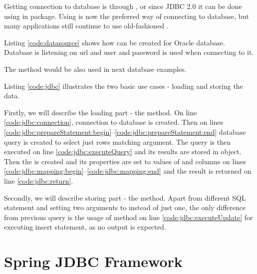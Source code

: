 Getting connection to database is through , or since JDBC 2.0
it can be done using  in  \citep{javax.sql} package.
Using  is now the preferred way of connecting to database,
but many applications still continue to use old-fashioned .

Listing \ref{code:datasource} shows how  can be created for Oracle database.\break
Database is listening on url 
and  user and  password is used when connecting to it.

The  method would be also used in next database examples.



Listing \ref{code:jdbc} illustrates the two basic use cases - loading and storing the data.

Firstly, we will describe the loading part - the  method.
On line \ref{code:jdbc:connection}, connection to database is created.
Then on lines \ref{code:jdbc:prepareStatement:begin}--\ref{code:jdbc:prepareStatement:end}
database query is created to select just rows matching  argument.
The query is then executed on line \ref{code:jdbc:executeQuery} and its results are stored
in  object. Then the  is created and its properties are
set to values of  and  columns on lines
\ref{code:jdbc:mapping:begin}--\ref{code:jdbc:mapping:end} and the result is returned on line \ref{code:jdbc:return}.

Secondly, we will describe storing part - the  method.
Apart from different SQL statement and setting two arguments to  instead of just one,
the only difference  from previous query is the usage of  method
on line \ref{code:jdbc:executeUpdate} for executing insert statement, as no output is expected.




\section{Spring JDBC Framework \label{frameworks:jdbcTemplate}}

